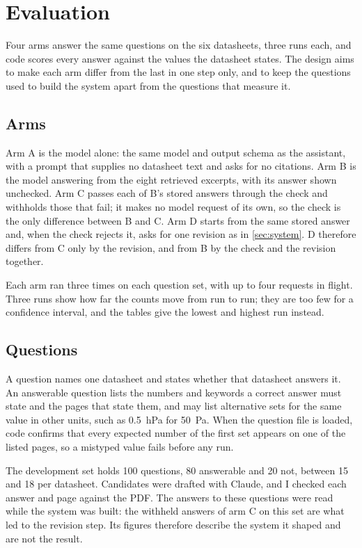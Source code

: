 \section{Evaluation}
\label{sec:evaluation}

Four arms answer the same questions on the six datasheets, three runs each, and code scores every answer against the values the datasheet states. The design aims to make each arm differ from the last in one step only, and to keep the questions used to build the system apart from the questions that measure it.

\subsection{Arms}

Arm A is the model alone: the same model and output schema as the assistant, with a prompt that supplies no datasheet text and asks for no citations. Arm B is the model answering from the eight retrieved excerpts, with its answer shown unchecked. Arm C passes each of B's stored answers through the check and withholds those that fail; it makes no model request of its own, so the check is the only difference between B and C. Arm D starts from the same stored answer and, when the check rejects it, asks for one revision as in \cref{sec:system}. D therefore differs from C only by the revision, and from B by the check and the revision together.

Each arm ran three times on each question set, with up to four requests in flight. Three runs show how far the counts move from run to run; they are too few for a confidence interval, and the tables give the lowest and highest run instead.

\subsection{Questions}

A question names one datasheet and states whether that datasheet answers it. An answerable question lists the numbers and keywords a correct answer must state and the pages that state them, and may list alternative sets for the same value in other units, such as \qty{0.5}{\hecto\pascal} for \qty{50}{\pascal}. When the question file is loaded, code confirms that every expected number of the first set appears on one of the listed pages, so a mistyped value fails before any run.

The development set holds 100 questions, 80 answerable and 20 not, between 15 and 18 per datasheet. Candidates were drafted with Claude, and I checked each answer and page against the PDF. The answers to these questions were read while the system was built: the withheld answers of arm C on this set are what led to the revision step. Its figures therefore describe the system it shaped and are not the result.

